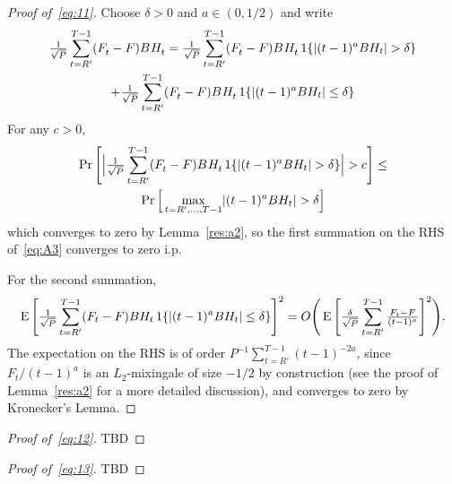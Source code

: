 \documentclass[12pt,fleqn]{article}
\begin{document}
\begin{proof}[Proof of~\eqref{eq:11}]
Choose $\delta > 0$ and $a \in (0,1/2)$ and write
\begin{multline}\label{eq:A3}
  \tfrac{1}{\sqrt{P}} \sum_{t=R'}^{T-1} (F_t^{} - F) B^{} H_t^{} =
  \tfrac{1}{\sqrt{P}} \sum_{t=R'}^{T-1} (F_t^{} - F) B^{} H_t^{} \operatorname{1}\{ \lvert (t - 1)^a B H_t \rvert > \delta\} \\
  + \tfrac{1}{\sqrt{P}} \sum_{t=R'}^{T-1} (F_t^{} - F) B^{} H_t^{} \operatorname{1}\{ \lvert (t - 1)^a B H_t \rvert \leq \delta\}
\end{multline}
For any $c > 0$,
\begin{multline*}
  \Pr\Bigg[ \Big\lvert \tfrac{1}{\sqrt{P}} \sum_{t=R'}^{T-1} (F_t^{} - F) B^{} H_t^{} \operatorname{1}\{ \lvert (t-1)^a B H_t \rvert > \delta\} \Big\rvert > c \Bigg]
  \leq \\ \Pr\Big[\max_{t=R',\dots,T-1} \lvert (t-1)^a B H_t \rvert > \delta \Big]
\end{multline*}
which converges to zero by Lemma~\ref{res:a2}, so the first summation on
the RHS of~\eqref{eq:A3} converges to zero i.p.

For the second summation,
\begin{equation*}
  \operatorname{E} \Bigg[ \tfrac{1}{\sqrt{P}} \sum_{t=R'}^{T-1} (F_t - F) B H_t
    \operatorname{1}\{\lvert (t-1)^a B H_t \rvert \leq \delta\}\Bigg]^2
   = O\Bigg(\operatorname{E} \Bigg[ \tfrac{\delta}{\sqrt{P}} \sum_{t=R'}^{T-1} \tfrac{F_t - F}{(t-1)^a} \Bigg]^2\Bigg).
\end{equation*}
The expectation on the RHS is of order
$P^{-1} \sum_{t=R'}^{T-1} (t-1)^{-2a}$, since $F_t / (t-1)^a$ is an
$L_2$-mixingale of size $-1/2$ by construction (see the proof of
Lemma~\ref{res:a2} for a more detailed discussion), and converges to
zero by Kronecker's Lemma.
\end{proof}

\begin{proof}[Proof of~\eqref{eq:12}]
TBD
\end{proof}

\begin{proof}[Proof of~\eqref{eq:13}]
TBD
\end{proof}

\setcounter{secnumdepth}{1}

\end{document}
